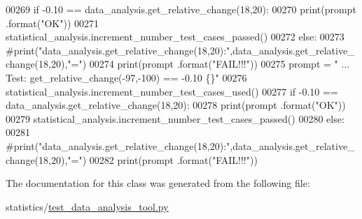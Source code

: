 \begin{DoxyCode}
00269         \textcolor{keywordflow}{if} -0.10 == data\_analysis.get\_relative\_change(18,20):
00270             print(prompt .format(\textcolor{stringliteral}{"OK"}))
00271             statistical\_analysis.increment\_number\_test\_cases\_passed()
00272         \textcolor{keywordflow}{else}:
00273             \textcolor{comment}{
      #print("data\_analysis.get\_relative\_change(18,20):",data\_analysis.get\_relative\_change(18,20),"=")}
00274             print(prompt .format(\textcolor{stringliteral}{"FAIL!!!"}))
00275         prompt = \textcolor{stringliteral}{"  ... Test: get\_relative\_change(-97,-100) == -0.10        \{\}"}
00276         statistical\_analysis.increment\_number\_test\_cases\_used()
00277         \textcolor{keywordflow}{if} -0.10 == data\_analysis.get\_relative\_change(18,20):
00278             print(prompt .format(\textcolor{stringliteral}{"OK"}))
00279             statistical\_analysis.increment\_number\_test\_cases\_passed()
00280         \textcolor{keywordflow}{else}:
00281             \textcolor{comment}{
      #print("data\_analysis.get\_relative\_change(18,20):",data\_analysis.get\_relative\_change(18,20),"=")}
00282             print(prompt .format(\textcolor{stringliteral}{"FAIL!!!"}))
\end{DoxyCode}


The documentation for this class was generated from the following file\+:\begin{DoxyCompactItemize}
\item 
statistics/\hyperlink{test__data__analysis__tool_8py}{test\+\_\+data\+\_\+analysis\+\_\+tool.\+py}\end{DoxyCompactItemize}
